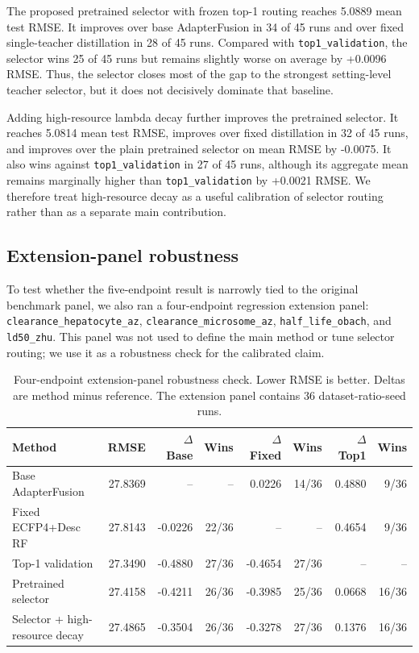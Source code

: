 \documentclass[11pt]{article}
\begin{document}
The proposed pretrained selector with frozen top-1 routing reaches 5.0889 mean
test RMSE. It improves over base AdapterFusion in 34 of 45 runs and over fixed
single-teacher distillation in 28 of 45 runs. Compared with
\texttt{top1\_validation}, the selector wins 25 of 45 runs but remains slightly
worse on average by +0.0096 RMSE. Thus, the selector closes most of the gap to
the strongest setting-level teacher selector, but it does not decisively
dominate that baseline.

Adding high-resource lambda decay further improves the pretrained selector. It
reaches 5.0814 mean test RMSE, improves over fixed distillation in 32 of 45
runs, and improves over the plain pretrained selector on mean RMSE by -0.0075.
It also wins against \texttt{top1\_validation} in 27 of 45 runs, although its
aggregate mean remains marginally higher than \texttt{top1\_validation} by
+0.0021 RMSE. We therefore treat high-resource decay as a useful calibration
of selector routing rather than as a separate main contribution.

\subsection{Extension-panel robustness}

To test whether the five-endpoint result is narrowly tied to the original
benchmark panel, we also ran a four-endpoint regression extension panel:
\texttt{clearance\_hepatocyte\_az}, \texttt{clearance\_microsome\_az},
\texttt{half\_life\_obach}, and \texttt{ld50\_zhu}. This panel was not used to
define the main method or tune selector routing; we use it as a robustness
check for the calibrated claim.

\begin{table}[H]
\centering
\small
\setlength{\tabcolsep}{3pt}
\begin{tabular}{lrrrrrrr}
\toprule
Method & RMSE & \(\Delta\) Base & Wins & \(\Delta\) Fixed & Wins & \(\Delta\) Top1 & Wins \\
\midrule
Base AdapterFusion & 27.8369 & -- & -- & 0.0226 & 14/36 & 0.4880 & 9/36 \\
Fixed ECFP4+Desc RF & 27.8143 & -0.0226 & 22/36 & -- & -- & 0.4654 & 9/36 \\
Top-1 validation & 27.3490 & -0.4880 & 27/36 & -0.4654 & 27/36 & -- & -- \\
Pretrained selector & 27.4158 & -0.4211 & 26/36 & -0.3985 & 25/36 & 0.0668 & 16/36 \\
Selector + high-resource decay & 27.4865 & -0.3504 & 26/36 & -0.3278 & 27/36 & 0.1376 & 16/36 \\
\bottomrule
\end{tabular}
\caption{Four-endpoint extension-panel robustness check. Lower RMSE is better.
Deltas are method minus reference. The extension panel contains 36
dataset-ratio-seed runs.}
\label{tab:extension_robustness}
\end{table}
\end{document}
